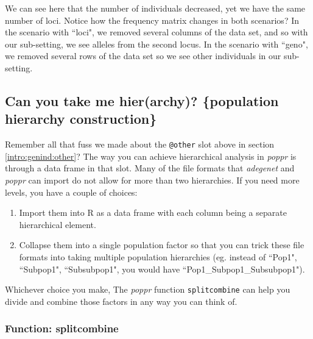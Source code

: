 \documentclass[letterpaper]{article}
\newcommand{\tab}{\hspace*{1em}}
\begin{document}
We can see here that the number of individuals decreased, yet we have the same number of loci. Notice how the frequency matrix changes in both scenarios? In the scenario with ``loci", we removed several columns of the data set, and so with our sub-setting, we see alleles from the second locus. In the scenario with ``geno", we removed several rows of the data set so we see other individuals in our sub-setting.
\subsection{Can you take me hier(archy)? \{population hierarchy construction\}}\label{data.manip:hier}

\tab\tab Remember all that fuss we made about the \texttt{@other} slot above in section \ref{intro:genind:other}? The way you can achieve hierarchical analysis in \textit{poppr} is through a data frame in that slot. Many of the file formats that \textit{adegenet} and \textit{poppr} can import do not allow for more than two hierarchies. If you need more levels, you have a couple of choices: 
\begin{enumerate}
  \item Import them into R as a data frame with each column being a separate hierarchical element.
  \item Collapse them into a single population factor so that you can trick these file formats into taking multiple population hierarchies (eg. instead of ``Pop1", ``Subpop1", ``Subsubpop1", you would have ``Pop1\_Subpop1\_Subsubpop1"). 
\end{enumerate}
Whichever choice you make, The \textit{poppr} function \texttt{splitcombine} can help you divide and combine those factors in any way you can think of.
\subsubsection{Function: splitcombine}\label{data.manip:hier:splitcombine}
\end{document}
